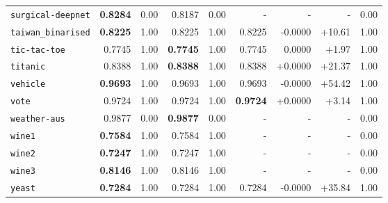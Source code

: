 \begin{tabular}{lrrrrrrrr}
\texttt{surgical-deepnet} & \textbf{0.8284} & 0.00 & 0.8187 & 0.00 & - & - & - & 0.00\\
\texttt{taiwan\_binarised} & \textbf{0.8225} & 1.00 & 0.8225 & 1.00 & 0.8225 & -0.0000 & +10.61 & 1.00\\
\texttt{tic-tac-toe} & 0.7745 & 1.00 & \textbf{0.7745} & 1.00 & 0.7745 & 0.0000 & +1.97 & 1.00\\
\texttt{titanic} & 0.8388 & 1.00 & \textbf{0.8388} & 1.00 & 0.8388 & +0.0000 & +21.37 & 1.00\\
\texttt{vehicle} & \textbf{0.9693} & 1.00 & 0.9693 & 1.00 & 0.9693 & -0.0000 & +54.42 & 1.00\\
\texttt{vote} & 0.9724 & 1.00 & 0.9724 & 1.00 & \textbf{0.9724} & +0.0000 & +3.14 & 1.00\\
\texttt{weather-aus} & 0.9877 & 0.00 & \textbf{0.9877} & 0.00 & - & - & - & 0.00\\
\texttt{wine1} & \textbf{0.7584} & 1.00 & 0.7584 & 1.00 & - & - & - & 0.00\\
\texttt{wine2} & \textbf{0.7247} & 1.00 & 0.7247 & 1.00 & - & - & - & 0.00\\
\texttt{wine3} & \textbf{0.8146} & 1.00 & 0.8146 & 1.00 & - & - & - & 0.00\\
\texttt{yeast} & \textbf{0.7284} & 1.00 & 0.7284 & 1.00 & 0.7284 & -0.0000 & +35.84 & 1.00\\
\bottomrule
\end{tabular}
